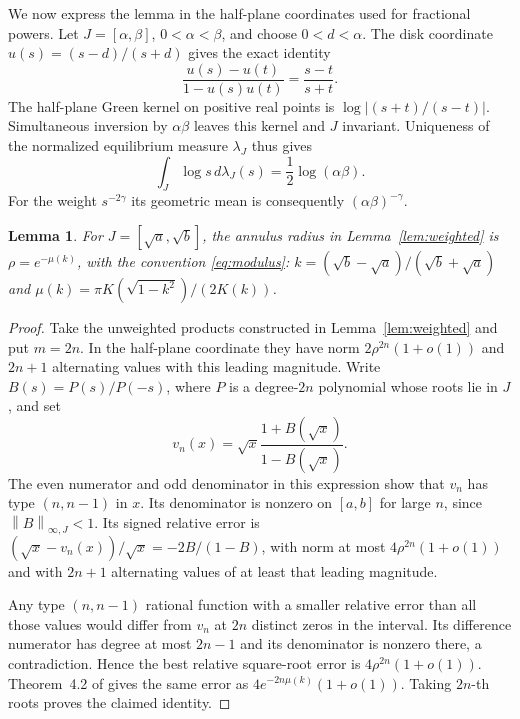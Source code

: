 \documentclass[11pt]{article}
\newtheorem{lemma}[theorem]{Lemma}
\newcommand{\norm}[1]{\left\lVert#1\right\rVert}
\begin{document}
We now express the lemma in the half-plane coordinates used for fractional
powers. Let $J=[\alpha,\beta]$, $0<\alpha<\beta$, and choose $0<d<\alpha$.
The disk coordinate $u(s)=(s-d)/(s+d)$ gives the exact identity
\begin{equation}\label{eq:half-plane-product}
 \frac{u(s)-u(t)}{1-u(s)u(t)}=\frac{s-t}{s+t}.
\end{equation}
The half-plane Green kernel on positive real points is
$\log|(s+t)/(s-t)|$. Simultaneous inversion by $\alpha\beta$ leaves this
kernel and $J$ invariant. Uniqueness of the normalized equilibrium
measure $\lambda_J$ thus gives
\begin{equation}\label{eq:log-mean}
 \int_J\log s\,d\lambda_J(s)=\frac12\log(\alpha\beta).
\end{equation}
For the weight $s^{-2\gamma}$ its geometric mean is consequently
$(\alpha\beta)^{-\gamma}$.

\begin{lemma}\label{lem:elliptic}
For $J=[\sqrt a,\sqrt b]$, the annulus radius in
Lemma~\ref{lem:weighted} is $\rho=e^{-\mu(k)}$, with the convention
\eqref{eq:modulus}: $k=(\sqrt b-\sqrt a)/(\sqrt b+\sqrt a)$ and
$\mu(k)=\pi K(\sqrt{1-k^2})/(2K(k))$.
\end{lemma}
\begin{proof}
Take the unweighted products constructed in Lemma~\ref{lem:weighted}
and put $m=2n$. In the half-plane coordinate they have norm
$2\rho^{2n}(1+o(1))$ and $2n+1$ alternating values with this leading
magnitude. Write $B(s)=P(s)/P(-s)$, where $P$ is a degree-$2n$
polynomial whose roots lie in $J$, and set
\[
 v_n(x)=\sqrt x\frac{1+B(\sqrt x)}{1-B(\sqrt x)}.
\]
The even numerator and odd denominator in this expression show that
$v_n$ has type $(n,n-1)$ in $x$. Its denominator is nonzero on $[a,b]$
for large $n$, since $\norm B_{\infty,J}<1$.
Its signed relative error is $(\sqrt x-v_n(x))/\sqrt x=-2B/(1-B)$,
with norm at most
$4\rho^{2n}(1+o(1))$ and with $2n+1$ alternating values of at least that
leading magnitude.

Any type $(n,n-1)$ rational function with a smaller relative error than
all those values would differ from $v_n$ at $2n$ distinct zeros in the
interval. Its difference numerator has degree at most $2n-1$ and its
denominator is nonzero there, a contradiction. Hence the best relative
square-root error is $4\rho^{2n}(1+o(1))$.
Theorem~4.2 of \cite{BH} gives the same error as
$4e^{-2n\mu(k)}(1+o(1))$. Taking $2n$-th roots proves the claimed identity.
\end{proof}
\end{document}
